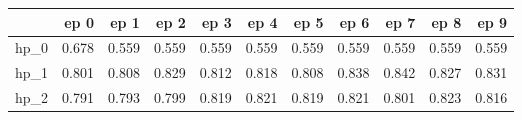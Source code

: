 \begin{tabular}{lrrrrrrrrrr}
\toprule
{} &   ep 0 &   ep 1 &   ep 2 &   ep 3 &   ep 4 &   ep 5 &   ep 6 &   ep 7 &   ep 8 &   ep 9 \\
\midrule
hp\_0 &  0.678 &  0.559 &  0.559 &  0.559 &  0.559 &  0.559 &  0.559 &  0.559 &  0.559 &  0.559 \\
hp\_1 &  0.801 &  0.808 &  0.829 &  0.812 &  0.818 &  0.808 &  0.838 &  0.842 &  0.827 &  0.831 \\
hp\_2 &  0.791 &  0.793 &  0.799 &  0.819 &  0.821 &  0.819 &  0.821 &  0.801 &  0.823 &  0.816 \\
\bottomrule
\end{tabular}
